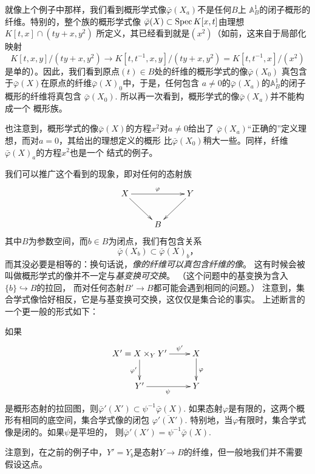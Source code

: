 就像上个例子中那样，我们看到概形学式像$\bar\varphi(X_a)$不是任何$B$上
$\mathbb A_B^1$的闭子概形的纤维。特别的，整个族的概形学式像
$\bar{\varphi}(X) \subset \operatorname{Spec} K[x, t]$由理想$K[t, x] \cap(t y+x, y^2)$
所定义，其已经看到就是$(x^2)$（如前，这来自于局部化映射
\[
    K[t, x, y] /(t y+x, y^2) \to K[t, t^{-1}, x, y] /
    (t y+x, y^2)=K[t, t^{-1}, x] /(x^2)
\]
是单的）。因此，我们看到原点$(t)\in B$处的纤维的概形学式的像$\bar\varphi(X_0)$
真包含于$\bar\varphi(X)$在原点的纤维$\bar\varphi(X)_0$中，于是，任何包含
$a\neq 0$的$\bar\varphi(X_a)$的$\mathbb A_B^1$的闭子概形的纤维将真包含
$\bar\varphi(X_0)$. 所以再一次看到，概形学式的像$\bar\varphi(X_a)$并不能构成一个
概形族。

也注意到，概形学式的像$\bar\varphi(X)$的方程$x^2$对$a\neq 0$给出了
$\bar\varphi(X_a)$“正确的”定义理想，而对$a=0$，其给出的理想定义的概形
比$\bar\varphi(X_0)$稍大一些。同样，纤维$\bar\varphi(X)_a$的方程$x^2$也是一个
结式的例子。

我们可以推广这个看到的现象，即对任何的态射族
\[
    \xymatrix{
        X\ar[rr]^\varphi\ar[rd]&&Y\ar[ld]\\
        &B&
    }
\]
其中$B$为参数空间，而$b\in B$为闭点，我们有包含关系
\[
    \bar{\varphi}(X_b) \subset \bar{\varphi}(X)_b，
\]
而其没必要是相等的：换句话说，\textit{像的纤维可以真包含纤维的像}。
这有时候会被叫做概形学式的像并不一定与\textit{基变换可交换}。
（这个问题中的基变换为含入$\{b\}\hookrightarrow B$的拉回，
而对任何态射$B'\to B$都可能会遇到相同的问题。）
注意到，集合学式像恰好相反，它是与基变换可交换，这仅仅是集合论的事实。
上述断言的一个更一般的形式如下：



\begin{pro}\label{pro:5.1.8}
    如果
    \[
    \xymatrix{
        X'=X\times_Y Y'\ar[r]^-{\psi'}\ar[d]_{\varphi'}&X\ar[d]^\varphi\\
        Y'\ar[r]_{\psi}&Y
    }
    \]
    是概形态射的拉回图，则$\bar\varphi'(X')\subset \psi^{-1}\bar\varphi(X)$.
    如果态射$\varphi$是有限的，这两个概形有相同的底空间，集合学式像的闭包
    $\overline{\varphi'(X')}$. 
    特别地，当$\varphi$有限时，集合学式像是闭的。如果$\psi$是平坦的，
    则$\bar\varphi'(X')=\psi^{-1}\bar\varphi(X)$.
\end{pro}

注意到，在之前的例子中，$Y'=Y_b$是态射$Y\to B$的纤维，但一般地我们并不需要假设这点。

